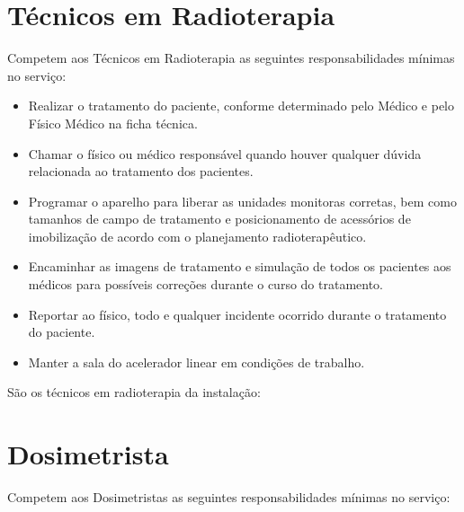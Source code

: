 \section{Técnicos em Radioterapia}
Competem aos Técnicos em Radioterapia as seguintes responsabilidades mínimas no serviço:
\begin{itemize}
    \item Realizar o tratamento do paciente, conforme determinado pelo Médico e pelo Físico Médico na ficha técnica.
    \item Chamar o físico ou médico responsável quando houver qualquer dúvida relacionada ao tratamento dos pacientes.
    \item Programar o aparelho para liberar as unidades monitoras corretas, bem como tamanhos de campo de tratamento e posicionamento de acessórios de imobilização de acordo com o planejamento radioterapêutico.
    \item Encaminhar as imagens de tratamento e simulação de todos os pacientes aos médicos para possíveis correções durante o curso do tratamento.
    \item Reportar ao físico, todo e qualquer incidente ocorrido durante o tratamento do paciente.
    \item Manter a sala do acelerador linear em condições de trabalho.
\end{itemize}

São os técnicos em radioterapia da instalação:

\begin{table}[!h]
    \centering
    \caption{Equipe de Técnicos em Radioterapia.}
    \label{tab:tecnicos}
\end{table}

\section{Dosimetrista}
Competem aos Dosimetristas as seguintes responsabilidades mínimas no serviço:

